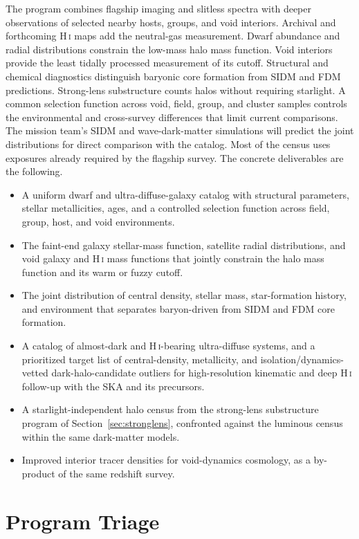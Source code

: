 The program combines flagship imaging and slitless spectra with deeper observations of selected nearby hosts, groups, and void interiors. Archival and forthcoming H\,\textsc{i} maps add the neutral-gas measurement. Dwarf abundance and radial distributions constrain the low-mass halo mass function. Void interiors provide the least tidally processed measurement of its cutoff. Structural and chemical diagnostics distinguish baryonic core formation from SIDM and FDM predictions. Strong-lens substructure counts halos without requiring starlight. A common selection function across void, field, group, and cluster samples controls the environmental and cross-survey differences that limit current comparisons. The mission team's SIDM and wave-dark-matter simulations will predict the joint distributions for direct comparison with the catalog. Most of the census uses exposures already required by the flagship survey. The concrete deliverables are the following.
\begin{itemize}[leftmargin=1.4em,itemsep=1pt,topsep=2pt]
\item A uniform dwarf and ultra-diffuse-galaxy catalog with structural parameters, stellar metallicities, ages, and a controlled selection function across field, group, host, and void environments.
\item The faint-end galaxy stellar-mass function, satellite radial distributions, and void galaxy and H\,\textsc{i} mass functions that jointly constrain the halo mass function and its warm or fuzzy cutoff.
\item The joint distribution of central density, stellar mass, star-formation history, and environment that separates baryon-driven from SIDM and FDM core formation.
\item A catalog of almost-dark and H\,\textsc{i}-bearing ultra-diffuse systems, and a prioritized target list of central-density, metallicity, and isolation/dynamics-vetted dark-halo-candidate outliers for high-resolution kinematic and deep H\,\textsc{i} follow-up with the SKA and its precursors.
\item A starlight-independent halo census from the strong-lens substructure program of Section~\ref{sec:stronglens}, confronted against the luminous census within the same dark-matter models.
\item Improved interior tracer densities for void-dynamics cosmology, as a by-product of the same redshift survey.
\end{itemize}

\clearpage
\section{Program Triage}

